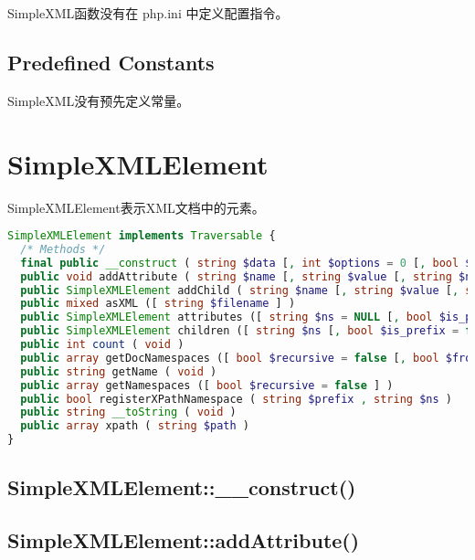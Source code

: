 SimpleXML函数没有在 php.ini 中定义配置指令。





\subsection{Predefined Constants}

SimpleXML没有预先定义常量。



\section{SimpleXMLElement}


SimpleXMLElement表示XML文档中的元素。





\begin{lstlisting}[language=PHP]
SimpleXMLElement implements Traversable {
  /* Methods */
  final public __construct ( string $data [, int $options = 0 [, bool $data_is_url = false [, string $ns = "" [, bool $is_prefix = false ]]]] )
  public void addAttribute ( string $name [, string $value [, string $namespace ]] )
  public SimpleXMLElement addChild ( string $name [, string $value [, string $namespace ]] )
  public mixed asXML ([ string $filename ] )
  public SimpleXMLElement attributes ([ string $ns = NULL [, bool $is_prefix = false ]] )
  public SimpleXMLElement children ([ string $ns [, bool $is_prefix = false ]] )
  public int count ( void )
  public array getDocNamespaces ([ bool $recursive = false [, bool $from_root = true ]] )
  public string getName ( void )
  public array getNamespaces ([ bool $recursive = false ] )
  public bool registerXPathNamespace ( string $prefix , string $ns )
  public string __toString ( void )
  public array xpath ( string $path )
}
\end{lstlisting}

\subsection{SimpleXMLElement::\_\_construct()}



\subsection{SimpleXMLElement::addAttribute()}



